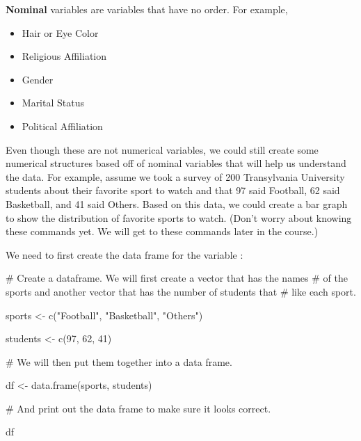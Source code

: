 \documentclass[
  letterpaper,
  DIV=11,
  numbers=noendperiod]{scrreprt}
\newenvironment{Shaded}{\begin{snugshade}}{\end{snugshade}}
\newcommand{\CommentTok}[1]{\textcolor[rgb]{0.37,0.37,0.37}{#1}}
\newcommand{\DecValTok}[1]{\textcolor[rgb]{0.68,0.00,0.00}{#1}}
\newcommand{\FunctionTok}[1]{\textcolor[rgb]{0.28,0.35,0.67}{#1}}
\newcommand{\NormalTok}[1]{\textcolor[rgb]{0.00,0.23,0.31}{#1}}
\newcommand{\OtherTok}[1]{\textcolor[rgb]{0.00,0.23,0.31}{#1}}
\newcommand{\StringTok}[1]{\textcolor[rgb]{0.13,0.47,0.30}{#1}}
\providecommand{\tightlist}{%
  \setlength{\itemsep}{0pt}\setlength{\parskip}{0pt}}\usepackage{longtable,booktabs,array}
\begin{document}
\textbf{Nominal} variables are variables that have no order. For
example,

\begin{itemize}
\tightlist
\item
  Hair or Eye Color
\item
  Religious Affiliation
\item
  Gender
\item
  Marital Status
\item
  Political Affiliation
\end{itemize}

Even though these are not numerical variables, we could still create
some numerical structures based off of nominal variables that will help
us understand the data. For example, assume we took a survey of 200
Transylvania University students about their favorite sport to watch and
that 97 said Football, 62 said Basketball, and 41 said Others. Based on
this data, we could create a bar graph to show the distribution of
favorite sports to watch. (Don't worry about knowing these commands yet.
We will get to these commands later in the course.)

We need to first create the data frame for the variable :

\begin{Shaded}
\begin{Highlighting}[]
\CommentTok{\# Create a dataframe. We will first create a vector that has the names}
\CommentTok{\# of the sports and another vector that has the number of students that}
\CommentTok{\# like each sport.}

\NormalTok{sports }\OtherTok{\textless{}{-}} \FunctionTok{c}\NormalTok{(}\StringTok{"Football"}\NormalTok{, }\StringTok{"Basketball"}\NormalTok{, }\StringTok{"Others"}\NormalTok{)}

\NormalTok{students }\OtherTok{\textless{}{-}} \FunctionTok{c}\NormalTok{(}\DecValTok{97}\NormalTok{, }\DecValTok{62}\NormalTok{, }\DecValTok{41}\NormalTok{)}

\CommentTok{\# We will then put them together into a data frame.}

\NormalTok{df }\OtherTok{\textless{}{-}} \FunctionTok{data.frame}\NormalTok{(sports, students)}

\CommentTok{\# And print out the data frame to make sure it looks correct.}

\NormalTok{df}
\end{Highlighting}
\end{Shaded}
\end{document}
